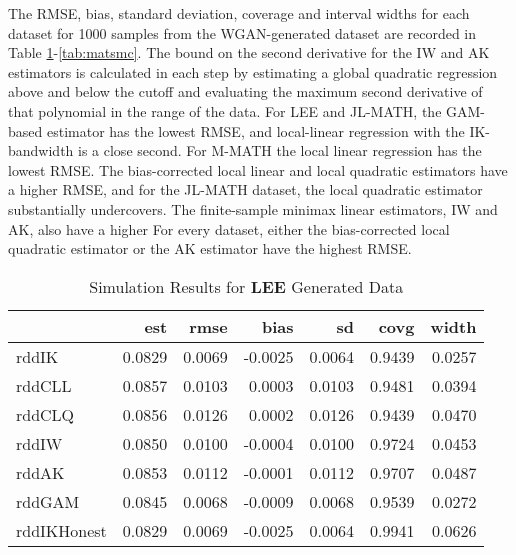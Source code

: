\documentclass[12pt]{article}
\theoremstyle{definition}
\begin{document}
The RMSE, bias, standard deviation, coverage and interval widths for each dataset for 1000 samples from the WGAN-generated dataset are recorded in Table \ref{tab:leemc}-\ref{tab:matsmc}. The bound on the second derivative for the IW and AK estimators is calculated in each step by estimating a global quadratic regression above and below the cutoff and evaluating the maximum second derivative of that polynomial in the range of the data. For LEE and JL-MATH, the GAM-based estimator has the lowest RMSE, and local-linear regression with the IK-bandwidth is a close second. For M-MATH the local linear regression has the lowest RMSE. The bias-corrected local linear and local quadratic estimators have a higher RMSE, and for the JL-MATH dataset, the local quadratic estimator substantially undercovers. The finite-sample minimax linear estimators, IW and AK, also have a higher For every dataset, either the bias-corrected local quadratic estimator or the AK estimator have the highest RMSE. 
\begin{table} [ht]
\centering 
\begin{tabular}{lrrrrrr}
\toprule
  & est & rmse & bias & sd & covg & width\\
\midrule
rddIK & 0.0829 & 0.0069 & -0.0025 & 0.0064 & 0.9439 & 0.0257\\
rddCLL & 0.0857 & 0.0103 & 0.0003 & 0.0103 & 0.9481 & 0.0394\\
rddCLQ & 0.0856 & 0.0126 & 0.0002 & 0.0126 & 0.9439 & 0.0470\\
rddIW & 0.0850 & 0.0100 & -0.0004 & 0.0100 & 0.9724 & 0.0453\\
rddAK & 0.0853 & 0.0112 & -0.0001 & 0.0112 & 0.9707 & 0.0487\\
\addlinespace
rddGAM & 0.0845 & 0.0068 & -0.0009 & 0.0068 & 0.9539 & 0.0272\\
rddIKHonest & 0.0829 & 0.0069 & -0.0025 & 0.0064 & 0.9941 & 0.0626\\
\bottomrule
\end{tabular}
\caption{Simulation Results for \textbf{LEE} Generated Data} 
\label{tab:leemc} 
\end{table} 
\end{document}
